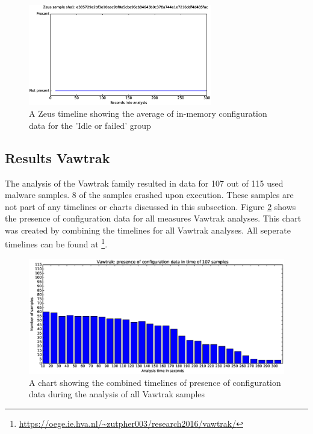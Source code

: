 \documentclass[conference]{IEEEtran}
\begin{document}
\begin{figure}[!h]
    \includegraphics[width=8cm,scale=0.5]{images/zeus/zeus-timelines-eps/Zeus-e385729e2bf3e10aac9bf0a5cbe96cb84643b0c378a744e1e7216ddf4d485fac.eps}
    \caption{A Zeus timeline showing the average of in-memory configuration data for the 'Idle or failed' group}
    \label{fig:zeus-timeline-idle}
\end{figure}

\newpage

\subsection{Results Vawtrak}
The analysis of the Vawtrak family resulted in data for 107 out of 115 used malware samples. 8 of the samples crashed upon execution. These samples are not part of any timelines or charts discussed in this subsection. Figure \ref{fig:vawtrak-bar} shows the presence of \Gls{configuration data} for all measures Vawtrak analyses. This chart was created by combining the timelines for all Vawtrak analyses. All seperate timelines can be found at \footnote{\url{https://oege.ie.hva.nl/~zutpher003/research2016/vawtrak/}}.


\begin{figure}[h]
	\hspace{-3cm}
    \includegraphics[width=13cm,trim=-70mm 0mm 0mm 9mm, clip=true]{images/vawtrak/Vawtrak-barchart.eps}
    \caption{A chart showing the combined timelines of presence of configuration data during the analysis of all Vawtrak samples}
    \label{fig:vawtrak-bar}
\end{figure}
\end{document}
